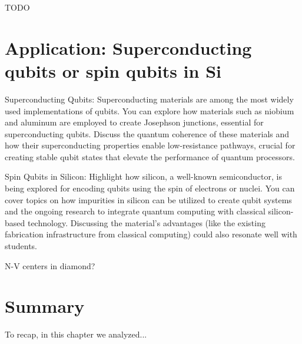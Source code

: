 \documentclass[12pt, english]{book}
\begin{document}
TODO 



\section{Application: Superconducting qubits or spin qubits in Si}

Superconducting Qubits: Superconducting materials are among the most widely used implementations of qubits. You can explore how materials such as niobium and aluminum are employed to create Josephson junctions, essential for superconducting qubits. Discuss the quantum coherence of these materials and how their superconducting properties enable low-resistance pathways, crucial for creating stable qubit states that elevate the performance of quantum processors.

Spin Qubits in Silicon: Highlight how silicon, a well-known semiconductor, is being explored for encoding qubits using the spin of electrons or nuclei. You can cover topics on how impurities in silicon can be utilized to create qubit systems and the ongoing research to integrate quantum computing with classical silicon-based technology. Discussing the material's advantages (like the existing fabrication infrastructure from classical computing) could also resonate well with students.

N-V centers in diamond?



\section{Summary}
To recap, in this chapter we analyzed...

\end{document}
